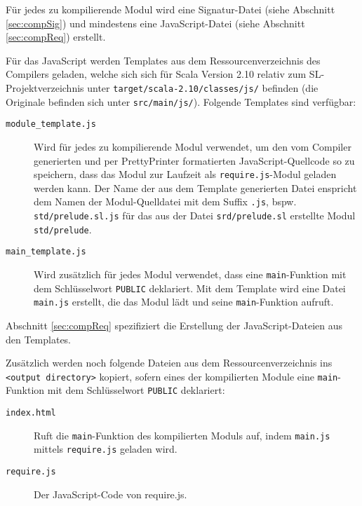 \documentclass[runningheads]{llncs}
\begin{document}
\begin{description}
\begin{description}
        Für jedes zu kompilierende Modul wird eine Signatur-Datei
        (siehe Abschnitt \ref{sec:compSig}) und mindestens
        eine JavaScript-Datei (siehe Abschnitt \ref{sec:compReq})
        erstellt.
        
        Für das JavaScript werden Templates aus dem
        Ressourcenverzeichnis des Compilers geladen, welche sich sich für
        Scala Version 2.10 relativ zum SL-Projektverzeichnis unter
        \texttt{target/scala-2.10/classes/js/} befinden (die Originale
        befinden sich unter \texttt{src/main/js/}). Folgende Templates
        sind verfügbar:
        
        \begin{description}
        \item[\texttt{module\_template.js}] Wird für jedes zu
            kompilierende Modul verwendet, um den vom Compiler
            generierten und per PrettyPrinter formatierten
            JavaScript-Quellcode so zu speichern, dass das Modul zur
            Laufzeit als \texttt{require.js}-Modul geladen werden kann. Der Name der
            aus dem Template generierten Datei enspricht dem Namen
            der Modul-Quelldatei mit dem Suffix \texttt{.js}, bspw.
            \texttt{std/prelude.sl.js} für das aus der Datei
            \texttt{srd/prelude.sl} erstellte Modul \texttt{std/prelude}.
        \item[\texttt{main\_template.js}] Wird zusätzlich für jedes
            Modul verwendet, dass eine \texttt{main}-Funktion
            mit dem Schlüsselwort \texttt{PUBLIC} deklariert.
            Mit dem Template wird eine Datei \texttt{main.js} erstellt,
            die das Modul lädt und seine \texttt{main}-Funktion aufruft.
        \end{description}
        
        Abschnitt \ref{sec:compReq} spezifiziert die Erstellung der
        JavaScript-Dateien aus den Templates.
                
        Zusätzlich werden noch folgende Dateien aus dem
        Ressourcenverzeichnis ins \texttt{<output directory>} kopiert,
        sofern eines der kompilierten Module eine \texttt{main}-Funktion
        mit dem Schlüsselwort \texttt{PUBLIC} deklariert:
        
        \begin{description}
        \item[\texttt{index.html}] Ruft die \texttt{main}-Funktion des
            kompilierten Moduls auf, indem \texttt{main.js} mittels
            \texttt{require.js} geladen wird.
        \item[\texttt{require.js}] Der JavaScript-Code von require.js.
        \end{description}
        

\end{description}
\end{description}
\end{document}
